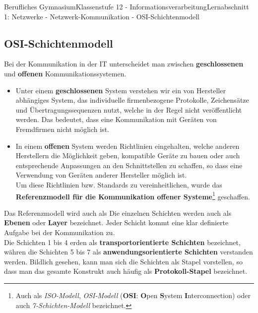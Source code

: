 \documentclass[11pt,oneside,openany,headings=optiontotoc,11pt,numbers=noenddot]{article}
\begin{document}
	\begin{worksheet}{Berufliches Gymnasium}{Klassenstufe 12 - Informationsverarbeitung}{Lernabschnitt 1: Netzwerke - Netzwerk-Kommunikation - OSI-Schichtenmodell}
		\setcounter{section}{1}
		\setcounter{subsection}{3}
		\subsection{OSI-Schichtenmodell}
		Bei der Kommunikation in der IT unterscheidet man zwischen \textbf{geschlossenen} und \textbf{offenen} Kommunikationssystemen.
		\begin{itemize}[label=$\circ$]
			\item Unter einem \textbf{geschlossenen} System verstehen wir ein von Hersteller abhängiges System, das individuelle firmenbezogene Protokolle, Zeichensätze und Übertragungssequenzen nutzt, welche in der Regel nicht veröffentlicht werden. Das bedeutet, dass eine Kommunikation mit Geräten von Fremdfirmen nicht  möglich ist.
			\item In einem \textbf{offenen} System werden Richtlinien eingehalten, welche anderen Herstellern die Möglichkeit geben, kompatible Geräte zu bauen oder auch entsprechende Anpassungen an den Schnittstellen zu schaffen, so dass eine Verwendung von Geräten anderer Hersteller möglich ist.\\
			Um diese Richtlinien bzw. Standards zu vereinheitlichen, wurde das \grqq{}\textbf{Referenzmodell für die Kommunikation offener Systeme}\grqq{}\footnote{Auch als \textit{ISO-Modell}, \textit{OSI-Modell} (\textbf{OSI}: \textbf{O}pen \textbf{S}ystem \textbf{I}nterconnection) oder auch \textit{7-Schichten-Modell} bezeichnet.} geschaffen. 
		\end{itemize}
		Das Referenzmodell wird auch als  Die einzelnen Schichten werden auch als \textbf{Ebenen} oder \textbf{Layer} bezeichnet. Jeder Schicht kommt eine klar definierte Aufgabe bei der Kommunikation zu.\\
		Die Schichten 1 bis 4 erden als \textbf{transportorientierte Schichten} bezeichnet, währen die Schichten 5 bis 7 als \textbf{anwendungsorientierte Schichten} verstanden werden. Bildlich gesehen, kann man sich die Schichten als Stapel vorstellen, so dass man das gesamte Konstrukt auch häufig als \textbf{Protokoll-Stapel} bezeichnet.

\end{worksheet}
\end{document}
